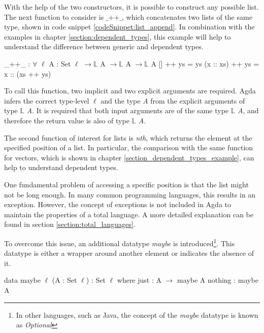 With the help of the two constructors, it is possible to construct any possible list. 
The next function to consider is $\text{\_++\_}$, which concatenates two lists of the same type, shown in code snippet \ref{codeSnippet:list_append}. 
In combination with the examples in chapter \ref{section:dependent_types}, this example will help to understand the difference between generic and dependent types.

\begin{codesnippet}[mathescape=true, caption={Definition of the list concatenation function in Agda}, label={codeSnippet:list_append}]
_++_ : $\forall$ {$\ell$} {A : Set $\ell$} $\rightarrow \mathbb{L}$ A $\rightarrow \mathbb{L}$ A $\rightarrow \mathbb{L}$ A
  []        ++ ys = ys
  (x :: xs) ++ ys = x :: (xs ++ ys)
\end{codesnippet}

To call this function, two implicit and two explicit arguments are required. 
Agda infers the correct type-level $\ell$ and the type \emph{A} from the explicit arguments of type $\mathbb{L}$ \emph{A}. 
It is required that both input arguments are of the same type $\mathbb{L}$ \emph{A}, and therefore the return value is also of type $\mathbb{L}$ \emph{A}.

The second function of interest for lists is \emph{nth}, which returns the element at the specified position of a list.
In particular, the comparison with the same function for vectors, which is shown in chapter \ref{section_dependent_types_example}, can help to understand dependent types.

One fundamental problem of accessing a specific position is that the list might not be long enough.
In many common programming languages, this results in an exception. However, the concept of exceptions is not included in Agda to maintain the properties of a total language.
A more detailed explanation can be found in section \ref{section:total_languages}.

To overcome this issue, an additional datatype \emph{maybe} is introduced\footnote{In other languages, such as Java, the concept of the \emph{maybe} datatype is known as \emph{Optional}}.
This datatype is either a wrapper around another element or indicates the absence of it.

\begin{codesnippet}[mathescape=true, caption={Definition of the maybe datatype in Agda}, label={codeSnippet:maybe_datatype}]
data maybe {$\ell$} (A : Set $\ell$) : Set $\ell$ where
  just : A $\rightarrow$ maybe A
  nothing : maybe A
\end{codesnippet}

